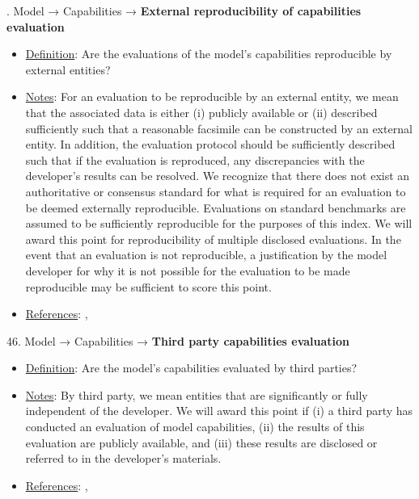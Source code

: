 . Model → Capabilities → \textbf{External reproducibility of capabilities evaluation}
\vspace{-\parskip}
\begin{itemize}
	\item
	\underline{Definition}: Are the evaluations of the model’s capabilities reproducible by external entities?
	\item
	\underline{Notes}: For an evaluation to be reproducible by an external entity, we mean that the associated data is either (i) publicly available or (ii) described sufficiently such that a reasonable facsimile can be constructed by an external entity. In addition, the evaluation protocol should be sufficiently described such that if the evaluation is reproduced, any discrepancies with the developer's results can be resolved. We recognize that there does not exist an authoritative or consensus standard for what is required for an evaluation to be deemed externally reproducible. Evaluations on standard benchmarks are assumed to be sufficiently reproducible for the purposes of this index. We will award this point for reproducibility of multiple disclosed evaluations. In the event that an evaluation is not reproducible, a justification by the model developer for why it is not possible for the evaluation to be made reproducible may be sufficient to score this point.
	\item
	\underline{References}: \citet{kapoor2023leakage}, \citet{liang2022helm}
\end{itemize}


46. Model → Capabilities → \textbf{Third party capabilities evaluation}
\vspace{-\parskip}
\begin{itemize}
	\item
	\underline{Definition}: Are the model’s capabilities evaluated by third parties?
	\item
	\underline{Notes}: By third party, we mean entities that are significantly or fully independent of the developer. We will award this point if (i) a third party has conducted an evaluation of model capabilities, (ii) the results of this evaluation are publicly available, and (iii) these results are disclosed or referred to in the developer’s materials.
	\item
	\underline{References}: \citet{raji2022audit}, \citet{liang2022helm}
\end{itemize}


